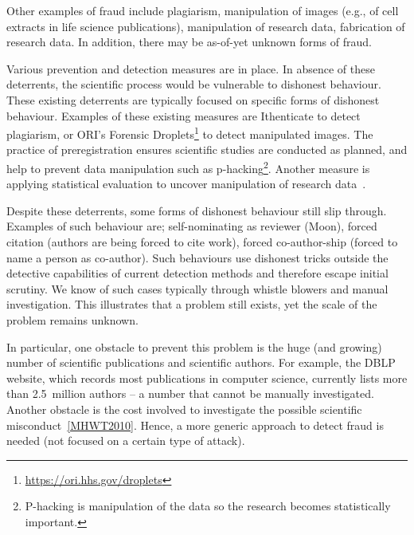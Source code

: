 \documentclass{ou-report}
\newcommand{\HJ}[1]{{\color{red} HJ: #1}}
\begin{document}
Other examples of fraud include plagiarism, manipulation  of images
(e.g., of cell extracts in life science publications), manipulation of research data, 
fabrication of research data. In addition, there may be as-of-yet unknown forms 
of fraud.

Various prevention and detection measures are in place. In absence of these 
deterrents, the scientific process would be vulnerable to dishonest behaviour. 
These existing deterrents are typically focused on specific forms of dishonest 
behaviour. Examples of these existing measures are Ithenticate to detect 
plagiarism, or ORI's Forensic Droplets\footnote{\url{https://ori.hhs.gov/droplets}} 
to detect manipulated images. The practice of preregistration ensures scientific 
studies are conducted as planned, and help to prevent data manipulation such as 
p-hacking\footnote{P-hacking is manipulation of the data so the research becomes 
statistically important.}. Another measure is applying statistical evaluation to 
uncover manipulation of research data~\cite{HGWA2019}. 

Despite these deterrents, some forms of dishonest behaviour still slip through.
Examples of such behaviour are;
self-nominating as reviewer (Moon), forced citation (authors are being forced
to cite work), forced co-author-ship (forced to name a person as co-author).
Such behaviours use dishonest tricks outside the detective capabilities of
current detection methods and therefore escape initial scrutiny. We know of
such cases typically through whistle blowers and manual investigation. 
This illustrates that a problem still exists, yet the scale of the
problem remains unknown.

In particular, one obstacle to prevent this problem is the huge (and growing) 
number of scientific 
publications and scientific authors. For example, the DBLP website, which 
records most publications in computer science, currently lists more than 
2.5~million authors -- a number that cannot be manually investigated. 
Another obstacle is the cost involved to investigate the possible scientific 
misconduct~\ref{MHWT2010}.
Hence, a 
more generic approach to detect fraud is needed (not focused on a certain type
of attack). 
\end{document}
